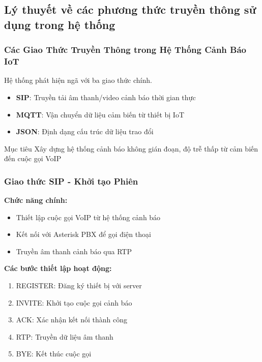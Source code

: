 \subsection{Lý thuyết về các phương thức truyền thông sử dụng trong hệ thống}
\begin{frame}
\frametitle{Các Giao Thức Truyền Thông trong Hệ Thống Cảnh Báo IoT}
\begin{center}
\Large Hệ thống phát hiện ngã với ba giao thức chính. 
\end{center}

\begin{itemize}
\item \textbf{SIP}: Truyền tải âm thanh/video cảnh báo thời gian thực
\item \textbf{MQTT}: Vận chuyển dữ liệu cảm biến từ thiết bị IoT  
\item \textbf{JSON}: Định dạng cấu trúc dữ liệu trao đổi
\end{itemize}

\begin{block}{Mục tiêu}
Xây dựng hệ thống cảnh báo không gián đoạn, độ trễ thấp từ cảm biến đến cuộc gọi VoIP
\end{block}
\end{frame}

\begin{frame}
\frametitle{Giao thức SIP - Khởi tạo Phiên}
\textbf{Chức năng chính:}
\begin{itemize}
\item Thiết lập cuộc gọi VoIP từ hệ thống cảnh báo
\item Kết nối với Asterisk PBX để gọi điện thoại
\item Truyền âm thanh cảnh báo qua RTP
\end{itemize}
\textbf{Các bước thiết lập hoạt động:}
\begin{enumerate}
\item REGISTER: Đăng ký thiết bị với server
\item INVITE: Khởi tạo cuộc gọi cảnh báo
\item ACK: Xác nhận kết nối thành công
\item RTP: Truyền dữ liệu âm thanh
\item BYE: Kết thúc cuộc gọi
\end{enumerate}
\end{frame}

